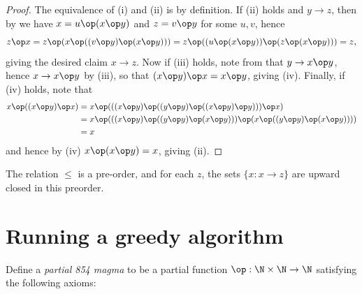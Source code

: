 \begin{proof}  The equivalence of (i) and (ii) is by definition.  If (ii) holds and $y \to z$, then by  we have $x = u \op (x \op y)$ and $z = v \op y$ for some $u,v$, hence
  $$ z \op x = z \op (x \op ((v \op y) \op (x \op y))) = z \op ((u \op (x \op y)) \op (z \op (x \op y))) = z,$$
giving the desired claim $x \to z$.  Now if (iii) holds, note from  that $y \to x \op y$, hence $x \to x \op y$ by (iii), so that $(x \op y) \op x = x \op y$, giving (iv).  Finally, if (iv) holds, note that
\begin{align*}
  x \op ((x \op y) \op x) &= x \op ( ((x \op y) \op ((y \op y) \op ((x \op y) \op y))) \op x) \\
  &= x \op (((x \op y) \op ((y \op y) \op (x \op y))) \op (x \op ((y \op y) \op (x \op y)))) \\
  &= x
\end{align*}
and hence by (iv) $x \op (x \op y) = x$, giving (ii).
\end{proof}

\begin{corollary}  The relation $\leq$ is a pre-order, and for each $z$, the sets $\{ x: x \to z \}$ are upward closed in this preorder.
\end{corollary}



\section{Running a greedy algorithm}

Define a \emph{partial 854 magma} to be a partial function $\op: \N \times \N \to \N$ satisfying the following axioms:

